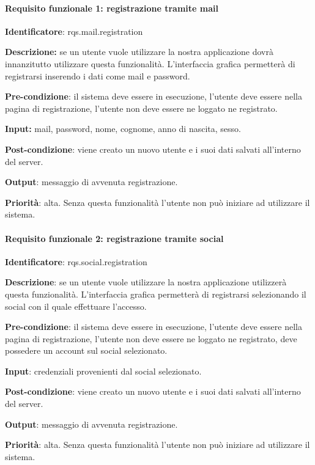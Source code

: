 \documentclass[12pt]{article}
\begin{document}
\paragraph{Requisito funzionale 1: registrazione tramite mail}

\textbf{Identificatore}: rqs.mail.registration

\textbf{Descrizione:} se un utente vuole utilizzare la nostra applicazione dovrà innanzitutto utilizzare questa funzionalità. L’interfaccia grafica permetterà di registrarsi inserendo i dati come mail e password.

\textbf{Pre-condizione}: il sistema deve essere in esecuzione, l’utente deve essere nella pagina di registrazione, l’utente non deve essere ne loggato ne registrato.

\textbf{Input:} mail, password, nome, cognome, anno di nascita, sesso.

\textbf{Post-condizione}: viene creato un nuovo utente e i suoi dati salvati all’interno del server.

\textbf{Output}: messaggio di avvenuta registrazione.

\textbf{Priorità}: alta. Senza questa funzionalità l’utente non può iniziare ad utilizzare il sistema.

\paragraph{Requisito funzionale 2: registrazione tramite social}

\textbf{Identificatore}: rqs.social.registration

\textbf{Descrizione}: se un utente vuole utilizzare la nostra applicazione utilizzerà questa funzionalità. L’interfaccia grafica permetterà di registrarsi selezionando il social con il quale effettuare l’accesso.

\textbf{Pre-condizione}: il sistema deve essere in esecuzione, l’utente deve essere nella pagina di registrazione, l’utente non deve essere ne loggato ne registrato, deve possedere un account sul social selezionato.

\textbf{Input}: credenziali provenienti dal social selezionato.

\textbf{Post-condizione}: viene creato un nuovo utente e i suoi dati salvati all’interno del server.

\textbf{Output}: messaggio di avvenuta registrazione.

\textbf{Priorità}: alta. Senza questa funzionalità l’utente non può iniziare ad utilizzare il sistema.
\end{document}
